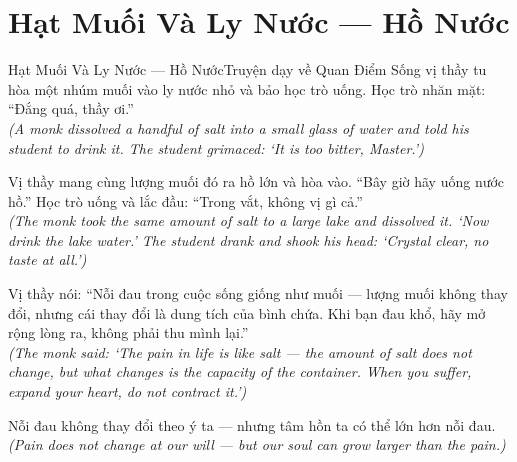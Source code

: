 \section{Hạt Muối Và Ly Nước --- Hồ Nước}
\begin{truyen}{Hạt Muối Và Ly Nước --- Hồ Nước}{Truyện dạy về Quan Điểm Sống}
 vị thầy tu hòa một nhúm muối vào ly nước nhỏ và bảo học trò uống. Học trò nhăn mặt: ``Đắng quá, thầy ơi.''\\[4pt]
\textit{(A monk dissolved a handful of salt into a small glass of water and told his student to drink it. The student grimaced: `It is too bitter, Master.')}

Vị thầy mang cùng lượng muối đó ra hồ lớn và hòa vào. ``Bây giờ hãy uống nước hồ.'' Học trò uống và lắc đầu: ``Trong vắt, không vị gì cả.''\\[4pt]
\textit{(The monk took the same amount of salt to a large lake and dissolved it. `Now drink the lake water.' The student drank and shook his head: `Crystal clear, no taste at all.')}

Vị thầy nói: ``Nỗi đau trong cuộc sống giống như muối --- lượng muối không thay đổi, nhưng cái thay đổi là dung tích của bình chứa. Khi bạn đau khổ, hãy mở rộng lòng ra, không phải thu mình lại.''\\[4pt]
\textit{(The monk said: `The pain in life is like salt --- the amount of salt does not change, but what changes is the capacity of the container. When you suffer, expand your heart, do not contract it.')}

\end{truyen}
\begin{baihoc}
  Nỗi đau không thay đổi theo ý ta --- nhưng tâm hồn ta có thể lớn hơn nỗi đau.\\[4pt]
  \textit{(Pain does not change at our will --- but our soul can grow larger than the pain.)}
\end{baihoc}

